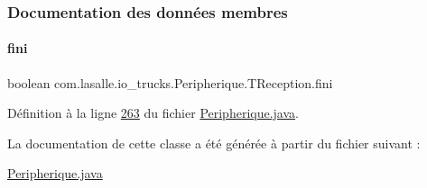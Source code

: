 \subsubsection{Documentation des données membres}
\mbox{\label{classcom_1_1lasalle_1_1io__trucks_1_1_peripherique_1_1_t_reception_af9ba647e407a9a150e1c37972233dbf9}} 
\paragraph{\texorpdfstring{fini}{fini}}
{\footnotesize\ttfamily boolean com.\+lasalle.\+io\+\_\+trucks.\+Peripherique.\+T\+Reception.\+fini\hspace{0.3cm}{\ttfamily [private]}}



Définition à la ligne \hyperlink{_peripherique_8java_source_l00263}{263} du fichier \hyperlink{_peripherique_8java_source}{Peripherique.\+java}.



La documentation de cette classe a été générée à partir du fichier suivant \+:\begin{DoxyCompactItemize}
\item 
\hyperlink{_peripherique_8java}{Peripherique.\+java}\end{DoxyCompactItemize}
